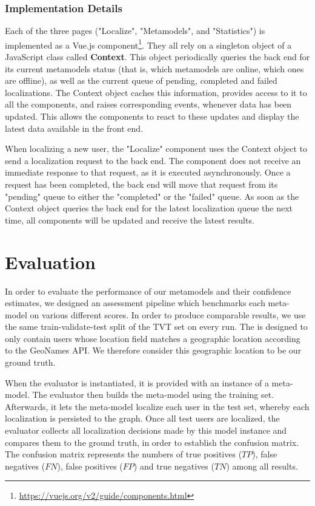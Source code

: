 \documentclass[10pt,a4paper]{article}
\begin{document}
\subsubsection{Implementation Details}
Each of the three pages ("Localize", "Metamodels", and "Statistics") is implemented as a Vue.js component\footnote{\href{https://vuejs.org/v2/guide/components.html}{https://vuejs.org/v2/guide/components.html}}. They all rely on a singleton object of a JavaScript class called \textbf{Context}. This object periodically queries the back end for its current metamodels status (that is, which metamodels are online, which ones are offline), as well as the current queue of pending, completed and failed localizations. The Context object caches this information, provides access to it to all the components, and raises corresponding events, whenever data has been updated. This allows the components to react to these updates and display the latest data available in the front end.

When localizing a new user, the "Localize" component uses the Context object to send a localization request to the back end. The component does not receive an immediate response to that request, as it is executed asynchronously. Once a request has been completed, the back end will move that request from its "pending" queue to either the "completed" or the "failed" queue. As soon as the Context object queries the back end for the latest localization queue the next time, all components will be updated and receive the latest results.


\section{Evaluation}
In order to evaluate the performance of our metamodels and their confidence estimates, we designed an assessment pipeline which benchmarks each meta-model on various different scores. In order to produce comparable results, we use the same train-validate-test split of the TVT set on every run. The is designed to only contain users whose location field matches a geographic location according to the GeoNames API. We therefore consider this geographic location to be our ground truth.

When the evaluator is instantiated, it is provided with an instance of a meta-model. The evaluator then builds the meta-model using the training set. Afterwards, it lets the meta-model localize each user in the test set, whereby each localization is persisted to the graph. Once all test users are localized, the evaluator collects all localization decisions made by this model instance and compares them to the ground truth, in order to establish the confusion matrix. The confusion matrix represents the numbers of true positives ($TP$), false negatives ($FN$), false positives ($FP$) and true negatives ($TN$) among all results.
\end{document}

